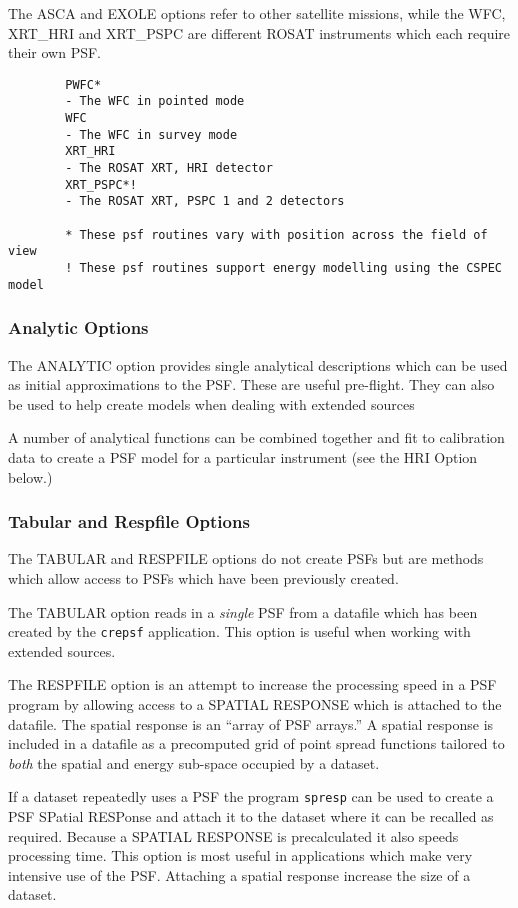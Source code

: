 \documentclass[11pt,fleqn]{article}    %
\begin{document}
The ASCA and EXOLE options refer to other satellite missions, while the WFC,
XRT\_HRI  and  XRT\_PSPC  are  different ROSAT   instruments which each
require their own PSF.

\begin{verbatim}
        PWFC*
        - The WFC in pointed mode 
        WFC 
        - The WFC in survey mode 
        XRT_HRI 
        - The ROSAT XRT, HRI detector 
        XRT_PSPC*!
        - The ROSAT XRT, PSPC 1 and 2 detectors 

        * These psf routines vary with position across the field of view
        ! These psf routines support energy modelling using the CSPEC model  
\end{verbatim}

\subsubsection{Analytic Options}
The ANALYTIC option provides single   analytical descriptions which can  be
used as initial approximations to the PSF. These  are useful pre-flight. 
They  can also be used  to help  create  models when  dealing with extended
sources

A  number of  analytical functions  can  be combined  together   and fit to
calibration data to create a PSF model for a particular instrument (see
the HRI Option below.)

\subsubsection{Tabular and Respfile Options}

The TABULAR and RESPFILE  options do  not  create PSFs  but are methods 
which allow access to PSFs which have been previously created.  

The  TABULAR option reads in  a {\it single} PSF from  a datafile which has
been created by  the {\tt crepsf} application. This  option is useful  when
working with extended sources.

The RESPFILE option is an attempt to increase the processing speed in a PSF
program by allowing access  to a SPATIAL  RESPONSE which is attached to the
datafile.  The spatial response  is an ``array  of PSF arrays.''  A spatial
response  is included in  a datafile as  a precomputed grid of point spread
functions tailored to {\it both} the spatial  and energy sub-space occupied
by a dataset.

If a dataset repeatedly uses a PSF the program {\tt spresp}  can be used to
create a PSF SPatial RESPonse and attach it to the dataset  where it can be
recalled as required.  Because a SPATIAL  RESPONSE is precalculated it also
speeds  processing time. This option  is most  useful in applications which
make very intensive use of the PSF. Attaching a spatial response increase the size of a dataset.
\end{document}
